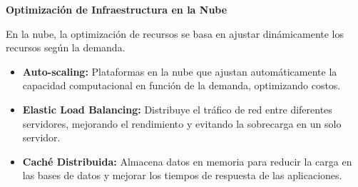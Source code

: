 \documentclass[14pt]{extarticle}
\begin{document}
\begin{enumerate}
    \vspace{0.3cm}
    \textbf{Optimización de Infraestructura en la Nube}

    En la nube, la optimización de recursos se basa en ajustar dinámicamente los recursos según la demanda.

    \begin{itemize}
      \item \textbf{Auto-scaling:} Plataformas en la nube que ajustan automáticamente la capacidad computacional en función de la demanda, optimizando costos.

      \item \textbf{Elastic Load Balancing:} Distribuye el tráfico de red entre diferentes servidores, mejorando el rendimiento y evitando la sobrecarga en un solo servidor.

      \item \textbf{Caché Distribuida:} Almacena datos en memoria para reducir la carga en las bases de datos y mejorar los tiempos de respuesta de las aplicaciones.
    \end{itemize}
  \end{enumerate}
\end{document}
